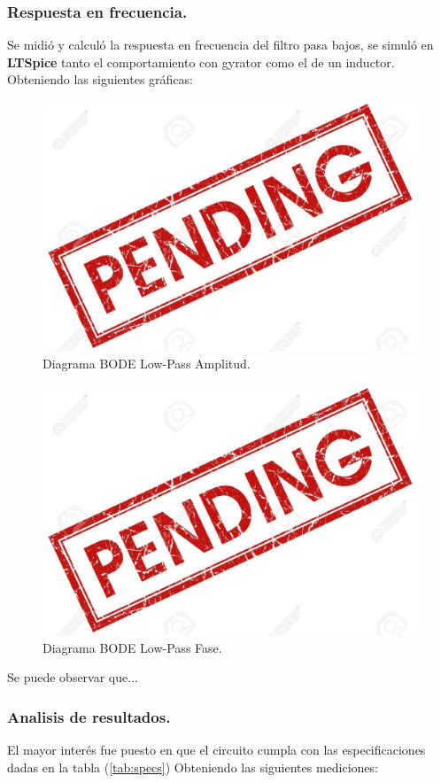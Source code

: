 \documentclass[a4paper]{article}
\begin{document}
\subsubsection{Respuesta en frecuencia.}
Se midió y calculó la respuesta en frecuencia del filtro pasa bajos, se simuló en \textbf{LTSpice}  tanto el comportamiento con gyrator como el de un inductor. Obteniendo las siguientes gráficas:
\begin{figure}[H]	
	\centering
	\includegraphics[width=\textwidth]{ImagenesEj2/bodelp.jpg}
	\caption{Diagrama BODE Low-Pass Amplitud.}
	\label{fig:bodelp}
\end{figure}
\begin{figure}[H]	
	\centering
	\includegraphics[width=\textwidth]{ImagenesEj2/bodelpp.jpg}
	\caption{Diagrama BODE Low-Pass Fase.}
	\label{fig:bodelpp}
\end{figure}
Se puede observar que...
\subsubsection{Analisis de resultados.}
El mayor interés fue puesto en que el circuito cumpla con las especificaciones dadas en la tabla (\ref{tab:specs})
Obteniendo las siguientes mediciones:
\end{document}
